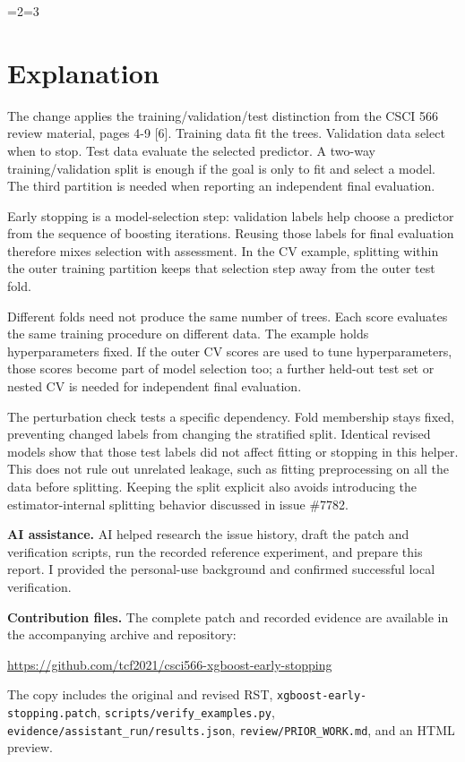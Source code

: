\documentclass[10pt,letterpaper]{article}
\let\oldsection\section
\renewcommand{\section}{\ifnum\value{section}=2\clearpage\fi\ifnum\value{section}=3\clearpage\fi\oldsection}
\begin{document}
\section{Explanation}\label{explanation}

The change applies the training/validation/test distinction from the
CSCI 566 review material, pages 4-9 {[}6{]}. Training data fit the
trees. Validation data select when to stop. Test data evaluate the
selected predictor. A two-way training/validation split is enough if the
goal is only to fit and select a model. The third partition is needed
when reporting an independent final evaluation.

Early stopping is a model-selection step: validation labels help choose
a predictor from the sequence of boosting iterations. Reusing those
labels for final evaluation therefore mixes selection with assessment.
In the CV example, splitting within the outer training partition keeps
that selection step away from the outer test fold.

Different folds need not produce the same number of trees. Each score
evaluates the same training procedure on different data. The example
holds hyperparameters fixed. If the outer CV scores are used to tune
hyperparameters, those scores become part of model selection too; a
further held-out test set or nested CV is needed for independent final
evaluation.

The perturbation check tests a specific dependency. Fold membership
stays fixed, preventing changed labels from changing the stratified
split. Identical revised models show that those test labels did not
affect fitting or stopping in this helper. This does not rule out
unrelated leakage, such as fitting preprocessing on all the data before
splitting. Keeping the split explicit also avoids introducing the
estimator-internal splitting behavior discussed in issue \#7782.

\textbf{AI assistance.} AI helped research the issue history, draft the
patch and verification scripts, run the recorded reference experiment,
and prepare this report. I provided the personal-use background and
confirmed successful local verification.

\textbf{Contribution files.} The complete patch and recorded evidence
are available in the accompanying archive and repository:

\url{https://github.com/tcf2021/csci566-xgboost-early-stopping}

The copy includes the original and revised RST,
\texttt{xgboost-early-stopping.patch},
\texttt{scripts/verify\_examples.py},
\texttt{evidence/assistant\_run/results.json},
\texttt{review/PRIOR\_WORK.md}, and an HTML preview.
\end{document}
